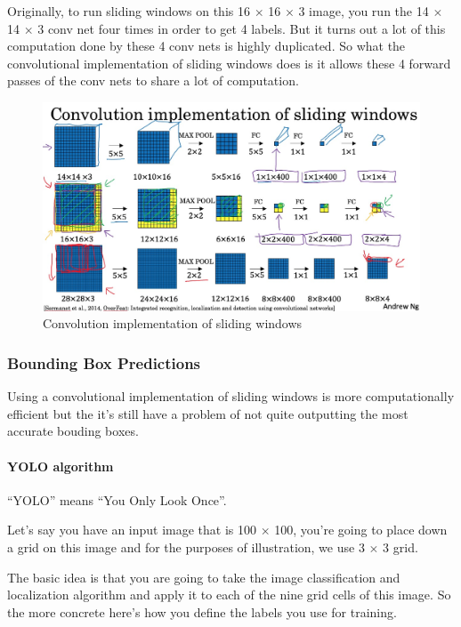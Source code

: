 \documentclass[UTF8]{article}
\begin{document}
Originally, to run sliding windows on this 16 $\times$ 16 $\times$ 3 image, you run the 14 $\times$
14 $\times$ 3 conv net four times in order to get 4 labels. But it turns out a lot of this
computation done by these 4 conv nets is highly duplicated. So what the convolutional implementation
of sliding windows does is it allows these 4 forward passes of the conv nets to share a lot of
computation.

\begin{figure}[htb]
    \centering
    \includegraphics[width=40em]{figures/conv-implementation-of-sliding-windows}
    \caption{Convolution implementation of sliding windows}
    \label{fig:conv-implementation-of-sliding-windows}
\end{figure}

\subsubsection{Bounding Box Predictions}
Using a convolutional implementation of sliding windows is more computationally efficient but the
it's still have a problem of not quite outputting the most accurate bouding boxes.

\paragraph{YOLO algorithm}
``YOLO'' means ``You Only Look Once''.

Let's say you have an input image that is 100 $\times$ 100, you're going to place down a grid on
this image and for the purposes of illustration, we use 3 $\times$ 3 grid.

The basic idea is that you are going to take the image classification and localization algorithm
and apply it to each of the nine grid cells of this image. So the more concrete here's how you
define the labels you use for training.
\end{document}
